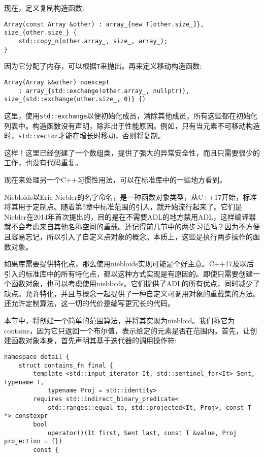 现在，定义复制构造函数:

\begin{lstlisting}[style=styleCXX]
Array(const Array &other) : array_{new T[other.size_]},
size_{other.size_} {
	std::copy_n(other.array_, size_, array_);
}
\end{lstlisting}

因为它分配了内存，可以根据\texttt{T}来抛出。再来定义移动构造函数:

\begin{lstlisting}[style=styleCXX]
Array(Array &&other) noexcept
	: array_{std::exchange(other.array_, nullptr)},
size_{std::exchange(other.size_, 0)} {}
\end{lstlisting}

这里，使用\texttt{std::exchange}以便初始化成员，清除其他成员，所有这些都在初始化列表中。构造函数没有声明，除非出于性能原因。例如，只有当元素不可移动构造时，\texttt{std::vector}才能在增长时移动，否则将复制。

这样！这里已经创建了一个数组类，提供了强大的异常安全性，而且只需要很少的工作，也没有代码重复。

现在来处理另一个C++习惯性用法，可以在标准库中的一些地方看到。


Niebloids以Eric Niebler的名字命名，是一种函数对象类型，从C++17开始，标准将其用于定制点。随着第5章中标准范围的引入，就开始流行起来了。它们是Niebler在2014年首次提出的，目的是在不需要ADL的地方禁用ADL，这样编译器就不会考虑来自其他名称空间的重载。还记得前几节中的两步习语吗？因为不方便且容易忘记，所以引入了自定义点对象的概念。本质上，这些是执行两步操作的函数对象。

如果库需要提供特化点，那么使用niebloids实现可能是个好主意。C++17及以后引入的标准库中的所有特化点，都以这种方式实现是有原因的。即使只需要创建一个函数对象，也可以考虑使用niebloids。它们提供了ADL的所有优点，同时减少了缺点。允许特化，并且与概念一起提供了一种自定义可调用对象的重载集的方法。还允许定制算法，这一切的代价是编写更冗长的代码。

本节中，将创建一个简单的范围算法，并将其实现为niebloid。我们称它为contains，因为它只返回一个布尔值，表示给定的元素是否在范围内。首先，让创建函数对象本身，首先声明其基于迭代器的调用操作符:

\begin{lstlisting}[style=styleCXX]
namespace detail {
	struct contains_fn final {
		template <std::input_iterator It, std::sentinel_for<It> Sent, typename T,
			typename Proj = std::identity>
		requires std::indirect_binary_predicate<
			std::ranges::equal_to, std::projected<It, Proj>, const T *> constexpr
		bool
			operator()(It first, Sent last, const T &value, Proj projection = {})
		const {
\end{lstlisting}

